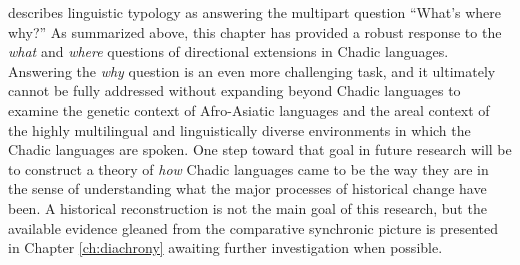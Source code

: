 \citet{bickelTypology21stCentury2007} describes linguistic typology as answering the multipart question ``What’s where why?'' As summarized above, this chapter has provided a robust response to the \textit{what} and \textit{where} questions of directional extensions in Chadic languages. Answering the \textit{why} question is an even more challenging task, and it ultimately cannot be fully addressed without expanding beyond Chadic languages to examine the genetic context of Afro-Asiatic languages and the areal context of the highly multilingual and linguistically diverse environments in which the Chadic languages are spoken. One step toward that goal in future research will be to construct a theory of \textit{how} Chadic languages came to be the way they are in the sense of understanding what the major processes of historical change have been. A historical reconstruction is not the main goal of this research, but the available evidence gleaned from the comparative synchronic picture is presented in Chapter \ref{ch:diachrony} awaiting further investigation when possible. 
